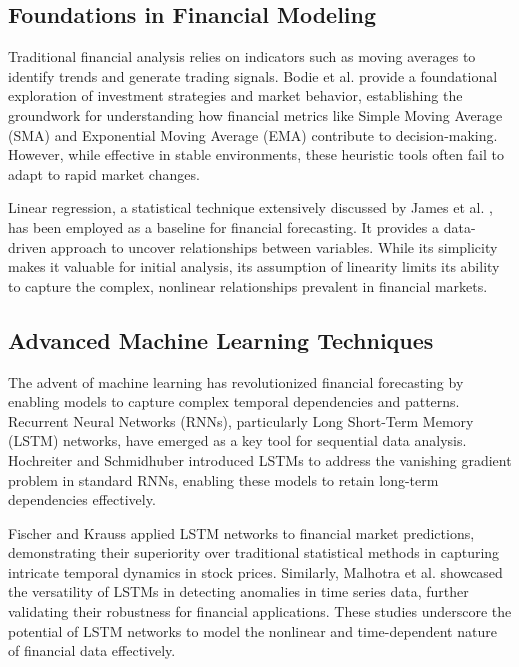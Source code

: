 \documentclass[10pt,twocolumn]{article}
\begin{document}
\subsection{Foundations in Financial Modeling}

Traditional financial analysis relies on indicators such as moving averages to identify trends and generate trading signals. Bodie et al. \cite{Bodie2014Essentials} provide a foundational exploration of investment strategies and market behavior, establishing the groundwork for understanding how financial metrics like Simple Moving Average (SMA) and Exponential Moving Average (EMA) contribute to decision-making. However, while effective in stable environments, these heuristic tools often fail to adapt to rapid market changes.

Linear regression, a statistical technique extensively discussed by James et al. \cite{James2021IntroStatLearning}, has been employed as a baseline for financial forecasting. It provides a data-driven approach to uncover relationships between variables. While its simplicity makes it valuable for initial analysis, its assumption of linearity limits its ability to capture the complex, nonlinear relationships prevalent in financial markets.

\subsection{Advanced Machine Learning Techniques}

The advent of machine learning has revolutionized financial forecasting by enabling models to capture complex temporal dependencies and patterns. Recurrent Neural Networks (RNNs), particularly Long Short-Term Memory (LSTM) networks, have emerged as a key tool for sequential data analysis. Hochreiter and Schmidhuber \cite{Hochreiter1997LSTM} introduced LSTMs to address the vanishing gradient problem in standard RNNs, enabling these models to retain long-term dependencies effectively.

Fischer and Krauss \cite{Fischer2017LSTMFinance} applied LSTM networks to financial market predictions, demonstrating their superiority over traditional statistical methods in capturing intricate temporal dynamics in stock prices. Similarly, Malhotra et al. \cite{Malhotra2015LSTMAnomaly} showcased the versatility of LSTMs in detecting anomalies in time series data, further validating their robustness for financial applications. These studies underscore the potential of LSTM networks to model the nonlinear and time-dependent nature of financial data effectively.
\end{document}
